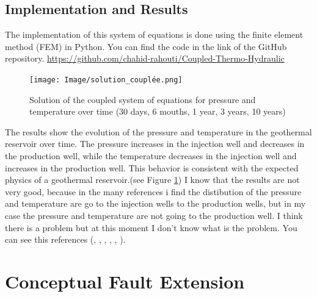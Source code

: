 \documentclass[a4paper,12pt]{report}
\begin{document}
\subsection{Implementation and Results}
The implementation of this system of equations is done using the finite 
element method (FEM) in Python. You can find the code in the link of the GitHub repository.
\href{https://github.com/chahid-rahouti/Coupled-Thermo-Hydraulic}{https://github.com/chahid-rahouti/Coupled-Thermo-Hydraulic}

\begin{figure}[h!]
    \centering
        \centering
        \texttt{[image: Image/solution\_couplée.png]}
        \caption{Solution of the coupled system of equations for pressure and temperature over time (30 days, 6 mouths, 1 year, 3 years, 10 years)}
        \label{fig:results}
\end{figure}
The results show the evolution of the pressure and temperature in 
the geothermal reservoir over time. The pressure increases in 
the injection well and decreases in the production well, while the temperature 
decreases in the injection well and increases in the production well. 
This behavior is consistent with the expected physics of a geothermal reservoir.(see Figure \ref{fig:results})
I know that the results are not very good, because in the many references i find the distibution
of the pressure and temperature are go to the injection wells to the production wells, but 
in my case the pressure and temperature are not going to the production well. I think there is a problem 
but at this moment I don't know what is the problem. You can see this references (\cite{1}, \cite{2}, \cite{3}, \cite{4}, \cite{5}, \cite{6}).
\section{Conceptual Fault Extension}
\end{document}
